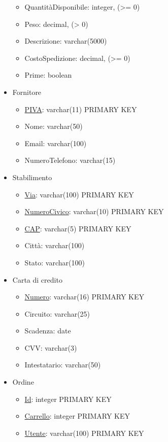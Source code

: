 \documentclass[11pt]{article}
\begin{document}
\begin{itemize}
\begin{itemize}
        \item QuantitàDisponibile: integer, (\textgreater{}= 0)
        \item Peso: decimal, (\textgreater{} 0)
        \item Descrizione: varchar(5000)
        \item CostoSpedizione: decimal, (\textgreater{}= 0)
        \item Prime: boolean
    \end{itemize}
    \item Fornitore
    \begin{itemize}
        \item \underline{PIVA}: varchar(11) PRIMARY KEY
        \item Nome: varchar(50)
        \item Email: varchar(100)
        \item NumeroTelefono: varchar(15)
    \end{itemize}
    \item Stabilimento
    \begin{itemize}
        \item \underline{Via}: varchar(100) PRIMARY KEY
        \item \underline{NumeroCivico}: varchar(10) PRIMARY KEY
        \item \underline{CAP}: varchar(5) PRIMARY KEY
        \item Città: varchar(100)
        \item Stato: varchar(100)
    \end{itemize}
    \item Carta di credito
    \begin{itemize}
        \item \underline{Numero}: varchar(16) PRIMARY KEY
        \item Circuito: varchar(25)
        \item Scadenza: date
        \item CVV: varchar(3)
        \item Intestatario: varchar(50)
    \end{itemize}
    \item Ordine
    \begin{itemize}
        \item \underline{Id}: integer PRIMARY KEY
        \item \underline{Carrello}: integer PRIMARY KEY
        \item \underline{Utente}: varchar(100) PRIMARY KEY

\end{itemize}
\end{itemize}
\end{document}
